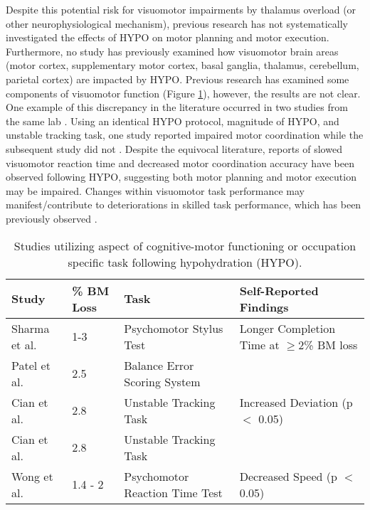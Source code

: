 Despite this potential risk for visuomotor impairments by thalamus overload (or other neurophysiological mechanism), previous research has not systematically investigated the effects of HYPO on motor planning and motor execution. Furthermore, no study has previously examined how visuomotor brain areas (motor cortex, supplementary motor cortex, basal ganglia, thalamus, cerebellum, parietal cortex) are impacted by HYPO. Previous research has examined some components of visuomotor function (Figure \ref{tbl:m_c_studies}), however, the results are not clear. One example of this discrepancy in the literature occurred in two studies from the same lab \cite{cian_effects_2001,cian_influence_2000}. Using an identical HYPO protocol, magnitude of HYPO, and unstable tracking task, one study reported impaired motor coordination \cite{cian_influence_2000} while the subsequent study did not \cite{cian_effects_2001}. Despite the equivocal literature, reports of slowed visuomotor reaction time \cite{wong_effects_2014} and decreased motor coordination accuracy \cite{sharma_influence_1986,cian_influence_2000} have been observed following HYPO, suggesting both motor planning and motor execution may be impaired. Changes within visuomotor task performance may manifest/contribute to deteriorations in skilled task performance, which has been previously observed \cite{baker_progressive_2007,smith_effect_2012,nuccio_fluid_2017}.

\begin{table}
	\caption{Studies utilizing aspect of cognitive-motor functioning or occupation specific task following hypohydration (HYPO).}
	\centering
	\begin{tabular}{llll} 
		\hline
		\footnotesize\textbf{Study} & \footnotesize\textbf{\% BM Loss} & \footnotesize\textbf{Task} & \footnotesize\textbf{Self-Reported Findings} \\
		\hline
		\footnotesize Sharma et al. \cite{sharma_influence_1986} & \footnotesize 1-3 & \footnotesize Psychomotor Stylus Test & \footnotesize Longer Completion Time at ${\ge}$2\% BM loss \\
		\footnotesize Patel et al. \cite{patel_neuropsychological_2007} & \footnotesize 2.5 & \footnotesize Balance Error Scoring System & \textemdash \\
		\footnotesize Cian et al. \cite{cian_influence_2000} & \footnotesize 2.8 & \footnotesize Unstable Tracking Task & \footnotesize Increased Deviation (p ${<}$ 0.05) \\
		\footnotesize Cian et al. \cite{cian_effects_2001} & \footnotesize 2.8 & \footnotesize Unstable Tracking Task & \textemdash \\
		\footnotesize Wong et al. \cite{wong_effects_2014} & \footnotesize 1.4 - 2 & \footnotesize Psychomotor Reaction Time Test & \footnotesize Decreased Speed (p ${<}$ 0.05) \\
		\hline		    
	\end{tabular}
	\label{tbl:m_c_studies}
\end{table}

